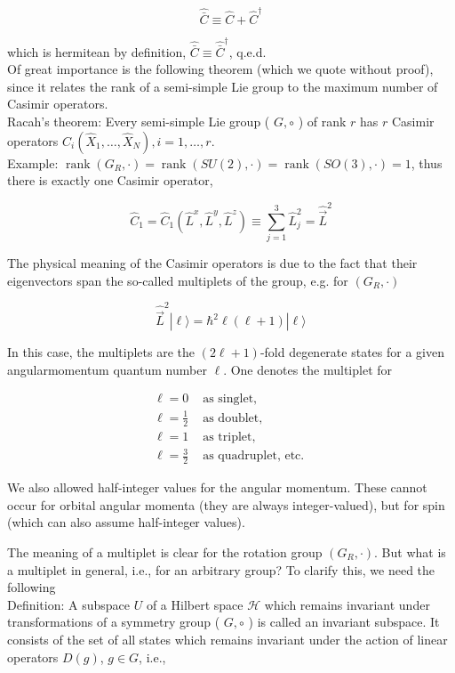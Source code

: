 \documentclass[10pt, letterpaper]{article}
\begin{document}
$$
\hat{\bar{C}} \equiv \hat{C}+\hat{C}^{\dagger}
$$

which is hermitean by definition, $\hat{\bar{C}} \equiv \hat{\bar{C}}^{\dagger}$, q.e.d.\\
Of great importance is the following theorem (which we quote without proof), since it relates the rank of a semi-simple Lie group to the maximum number of Casimir operators.\\
Racah's theorem: Every semi-simple Lie group ( $G, \circ$ ) of rank $r$ has $r$ Casimir operators $\hat{C}_{i}\left(\hat{X}_{1}, \ldots, \hat{X}_{N}\right), i=1, \ldots, r$.\\
Example: $\operatorname{rank}\left(G_{R}, \cdot\right)=\operatorname{rank}(S U(2), \cdot)=\operatorname{rank}(S O(3), \cdot)=1$, thus there is exactly one Casimir operator,

$$
\hat{C}_{1}=\hat{C}_{1}\left(\hat{L}^{x}, \hat{L}^{y}, \hat{L}^{z}\right) \equiv \sum_{j=1}^{3} \hat{L}_{j}^{2}=\hat{\vec{L}}^{2}
$$

The physical meaning of the Casimir operators is due to the fact that their eigenvectors span the so-called multiplets of the group, e.g. for $\left(G_{R}, \cdot\right)$

$$
\hat{\vec{L}}^{2}|\ell\rangle=\hbar^{2} \ell(\ell+1)|\ell\rangle
$$

In this case, the multiplets are the $(2 \ell+1)$-fold degenerate states for a given angularmomentum quantum number $\ell$. One denotes the multiplet for

$$
\begin{array}{ll}
\ell=0 & \text { as singlet, } \\
\ell=\frac{1}{2} & \text { as doublet, } \\
\ell=1 & \text { as triplet, } \\
\ell=\frac{3}{2} & \text { as quadruplet, etc. }
\end{array}
$$

We also allowed half-integer values for the angular momentum. These cannot occur for orbital angular momenta (they are always integer-valued), but for spin (which can also assume half-integer values).

The meaning of a multiplet is clear for the rotation group $\left(G_{R}, \cdot\right)$. But what is a multiplet in general, i.e., for an arbitrary group? To clarify this, we need the following\\
Definition: A subspace $U$ of a Hilbert space $\mathcal{H}$ which remains invariant under transformations of a symmetry group ( $G, \circ$ ) is called an invariant subspace. It consists of the set of all states which remains invariant under the action of linear operators $D(g)$, $g \in G$, i.e.,
\end{document}
